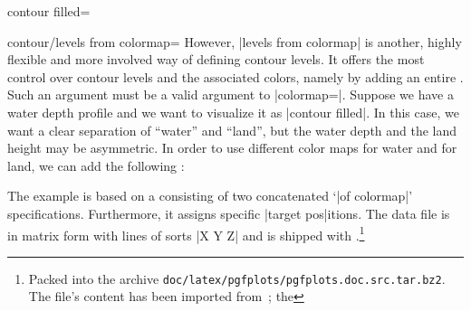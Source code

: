 {{\begin{plottype}[/pgfplots]{
    contour filled=\textcolor{black}{}%
}
\begin{pgfplotskey}{contour/levels from colormap=}
        However, |levels from colormap| is another, highly flexible and more
        involved way of defining contour levels. It offers the most control
        over contour levels and the associated colors, namely by adding an
        entire . Such an argument must be a valid
        argument to |colormap=|. Suppose
        we have a water depth profile and we want to visualize it as
        |contour filled|. In this case, we want a clear separation of ``water''
        and ``land'', but the water depth and the land height may be
        asymmetric. In order to use different color maps for water and for
        land, we can add the following :
\pgfplotsexpensiveexample
\begin{codeexample}[]
\end{codeexample}
        The example is based on a  consisting of two concatenated `|of colormap|' specifications. Furthermore, it assigns specific |target pos|itions. The data file is in matrix form with lines of sorts |X Y Z| and is shipped with \PGFPlots{}.\footnote{Packed into the
        archive \texttt{doc/latex/pgfplots/pgfplots.doc.src.tar.bz2}. The
        file's content has been imported from~\cite{LiveAccessServer}; the
}
\end{pgfplotskey}
\end{plottype}}}
